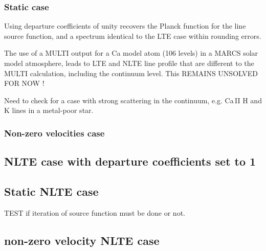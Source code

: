 \documentclass[a4paper,12pt]{article}
\begin{document}
\subsubsection{Static case}
Using departure coefficients of unity recovers the Planck function for the line source function, and a spectrum identical 
to the LTE case within rounding errors.

The use of a MULTI output for a Ca model atom (106 levels) in a MARCS solar model atmosphere, leads  to
LTE and NLTE line profile that are different to the MULTI calculation, including the continuum level.
This REMAINS UNSOLVED FOR NOW !

Need to check for a case with strong scattering in the continuum, e.g. Ca\,II H and K lines in a metal-poor star.

\subsubsection{Non-zero velocities case}
\subsection{NLTE case with departure coefficients set to 1}
\subsection{Static NLTE case}

TEST if iteration of source function must be done or not.

\subsection{non-zero velocity NLTE case}
\end{document}

